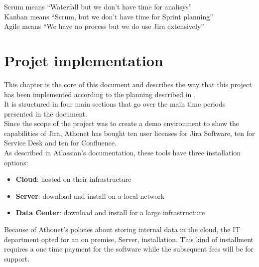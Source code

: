 \begin{savequote}[90mm]
	Scrum means ``Waterfall but we don't have time for analisys''\\
	Kanban means ``Scrum, but we don't have time for Sprint planning''\\
	Agile means ``We have no process but we do use Jira extensively''
\end{savequote}

\chapter{Projet implementation}
\label{chapter_5}
	This chapter is the core of this document and describes the way that this project has been implemented according to the planning described in .\\
	It is structured in four main sections that go over the main time periods presented in the  document.\\
	Since the scope of the project was to create a demo environment to show the capabilities of Jira, Athonet has bought ten user licenses for Jira Software, ten for Service Desk and ten for Confluence.\\
	As described in Atlassian's documentation\cite{compare-atlassian-cloud-vs-server}, these tools have three installation options:
	\begin{itemize}
		\item \textbf{Cloud}: hosted on their infrastructure
		\item \textbf{Server}: download and install on a local network
		\item \textbf{Data Center}: download and install for a large infrastructure
	\end{itemize}
	Because of Athonet's policies about storing internal data in the cloud, the IT department opted for an on premise, Server, installation.
	This kind of installment requires a one time payment for the software while the subsequent fees will be for support.
